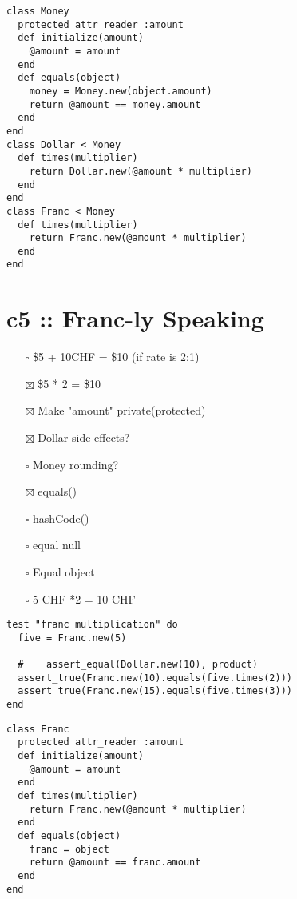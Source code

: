 \documentclass[11pt]{article}
\begin{document}
\begin{verbatim}
class Money
  protected attr_reader :amount
  def initialize(amount)
    @amount = amount
  end
  def equals(object)
    money = Money.new(object.amount)
    return @amount == money.amount
  end
end
class Dollar < Money
  def times(multiplier)
    return Dollar.new(@amount * multiplier)
  end
end
class Franc < Money
  def times(multiplier)
    return Franc.new(@amount * multiplier)
  end
end
\end{verbatim}

\section{c5 :: Franc-ly Speaking}
\label{sec:orgb7ceb0c}
\begin{itemize}
\item[{$\square$}] \$5 + 10CHF = \$10 (if rate is 2:1)
\item[{$\boxtimes$}] \$5 * 2 = \$10
\item[{$\boxtimes$}] Make "amount" private(protected)
\item[{$\boxtimes$}] Dollar side-effects?
\item[{$\square$}] Money rounding?
\item[{$\boxtimes$}] equals()
\item[{$\square$}] hashCode()
\item[{$\square$}] equal null
\item[{$\square$}] Equal object
\item[{$\square$}] 5 CHF *2 = 10 CHF
\end{itemize}

\begin{verbatim}
test "franc multiplication" do
  five = Franc.new(5)

  #    assert_equal(Dollar.new(10), product)
  assert_true(Franc.new(10).equals(five.times(2)))
  assert_true(Franc.new(15).equals(five.times(3)))
end
\end{verbatim}

\begin{verbatim}
class Franc
  protected attr_reader :amount
  def initialize(amount)
    @amount = amount
  end
  def times(multiplier)
    return Franc.new(@amount * multiplier)
  end
  def equals(object)
    franc = object
    return @amount == franc.amount
  end
end
\end{verbatim}
\end{document}
